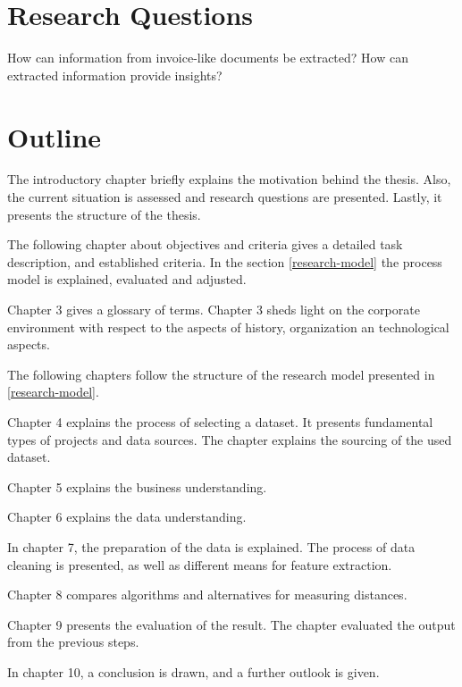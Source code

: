 \section{Research Questions}
\label{section:research-q}
How can information from invoice-like documents be extracted?
How can extracted information provide insights?

\section{Outline}
The introductory chapter briefly explains the motivation behind the thesis. Also, the current situation is assessed and research questions are presented. Lastly, it presents the structure of the thesis.

The following chapter about objectives and criteria gives a detailed task description, and established criteria. In the section \ref{research-model} the process model is explained, evaluated and adjusted.

Chapter 3 gives a glossary of terms. Chapter 3 sheds light on the corporate environment with respect to the aspects of history, organization an technological aspects. 

The following chapters follow the structure of the research model presented in \ref{research-model}.

Chapter 4 explains the process of selecting a dataset. It presents fundamental types of projects and data sources. The chapter explains the sourcing of the used dataset.

Chapter 5 explains the business understanding.

Chapter 6 explains the data understanding.

In chapter 7, the preparation of the data is explained. The process of data cleaning is presented, as well as different means for feature extraction.

Chapter 8 compares algorithms and alternatives for measuring distances.

Chapter 9 presents the evaluation of the result. The chapter evaluated the output from the previous steps.

In chapter 10, a conclusion is drawn, and a further outlook is given.